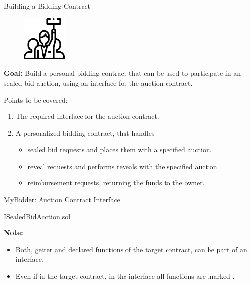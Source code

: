 \documentclass[handout]{beamer}
\begin{document}
\begin{frame}{Building a Bidding Contract}

\begin{minipage}{0.3\textwidth}
	\begin{figure}
		\center
		\includegraphics[width= 2.2cm]{../assets/images/bidder.png}	
	\end{figure}
\end{minipage}
\begin{minipage}{0.65\textwidth}
	\vspace{0.5em}
	\textbf{Goal:} Build a personal bidding contract that can be used to participate in an sealed bid auction, using an interface for the auction contract.\\
\end{minipage}

\vspace{2em}

Points to be covered:
\vspace{0.5em}
\begin{enumerate}
	\item	The required interface for the auction contract.
	\item	A personalized bidding contract, that handles
	\vspace{0.5em}
	\begin{itemize}
		\item sealed bid requests and places them with a specified auction.
		\item reveal requests and performs reveals with the specified auction.
		\item reimbursement requests, returning the funds to the owner.
	\end{itemize}
\end{enumerate}


\end{frame}


\begin{frame}{MyBidder: Auction Contract Interface}

\begin{samplecode}{ISealedBidAuction.sol}
	
\end{samplecode}

\textbf{Note:}
\begin{itemize}
	\item	Both, getter and declared functions of the target contract, can be part of an interface.
	\item	Even if  in the target contract, in the interface all functions are marked .
\end{itemize}

\end{frame}
\end{document}
